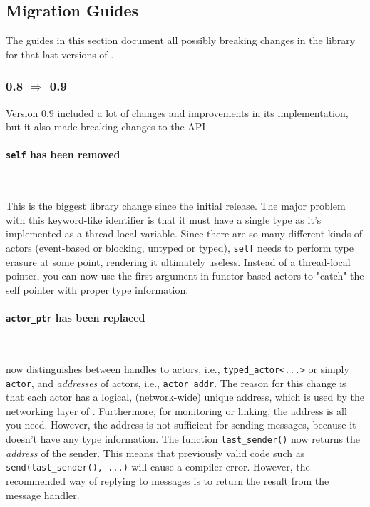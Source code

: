 \clearpage
\subsection{Migration Guides}

The guides in this section document all possibly breaking changes in the library for that last versions of \lib.

\subsubsection{0.8 $\Rightarrow$ 0.9}

Version 0.9 included a lot of changes and improvements in its implementation, but it also made breaking changes to the API.

\paragraph{\lstinline^self^ has been removed}

~

This is the biggest library change since the initial release.
The major problem with this keyword-like identifier is that it must have a single type as it's implemented as a thread-local variable.
Since there are so many different kinds of actors (event-based or blocking, untyped or typed), \lstinline^self^ needs to perform type erasure at some point, rendering it ultimately useless.
Instead of a thread-local pointer, you can now use the first argument in functor-based actors to "catch" the self pointer with proper type information.

\paragraph{\lstinline^actor_ptr^ has been replaced}

~

\lib now distinguishes between handles to actors, i.e., \lstinline^typed_actor<...>^ or simply \lstinline^actor^, and \emph{addresses} of actors, i.e., \lstinline^actor_addr^. The reason for this change is that each actor has a logical, (network-wide) unique address, which is used by the networking layer of \lib. Furthermore, for monitoring or linking, the address is all you need. However, the address is not sufficient for sending messages, because it doesn't have any type information. The function \lstinline^last_sender()^ now returns the \emph{address} of the sender.
This means that previously valid code such as \lstinline^send(last_sender(), ...)^ will cause a compiler error.
However, the recommended way of replying to messages is to return the result from the message handler.

